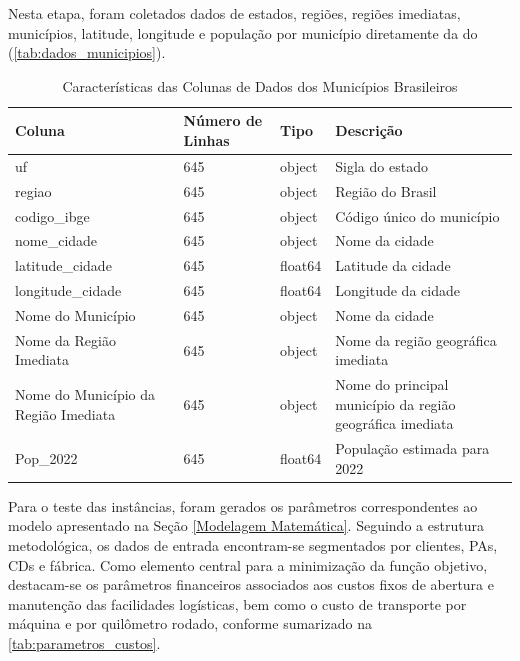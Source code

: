 Nesta etapa, foram coletados dados de estados, regiões, regiões imediatas, municípios, latitude, longitude e população por município diretamente da  do  \cite{ibge:2025:divisoesregionais} (\autoref{tab:dados_municipios}).

\begin{table}[h!]
\centering
\caption{Características das Colunas de Dados dos Municípios Brasileiros}
\label{tab:dados_municipios}
\begin{tabular}{|p{5cm}|p{2cm}|p{2cm}|p{5cm}|} %
\hline
\textbf{Coluna} & \textbf{Número de Linhas} & \textbf{Tipo} & \textbf{Descrição} \\
\hline
uf & 645 & object & Sigla do estado \\
\hline %
regiao & 645 & object & Região do Brasil \\
\hline %
codigo\_ibge & 645 & object & Código único do município \\
\hline %
nome\_cidade & 645 & object & Nome da cidade \\
\hline %
latitude\_cidade & 645 & float64 & Latitude da cidade \\
\hline %
longitude\_cidade & 645 & float64 & Longitude da cidade \\
\hline %
Nome do Município & 645 & object & Nome da cidade \\
\hline %
Nome da Região Imediata & 645 & object & Nome da região geográfica imediata \\
\hline %
Nome do Município da Região Imediata & 645 & object & Nome do principal município da região geográfica imediata \\
\hline %
Pop\_2022 & 645 & float64 & População estimada para 2022 \\
\hline
\end{tabular}
\end{table}


Para o teste das instâncias, foram gerados os parâmetros correspondentes ao modelo apresentado na Seção \ref{Modelagem Matemática}. Seguindo a estrutura metodológica, os dados de entrada encontram-se segmentados por clientes, PAs, CDs e fábrica. Como elemento central para a minimização da função objetivo, destacam-se os parâmetros financeiros associados aos custos fixos de abertura e manutenção das facilidades logísticas, bem como o custo de transporte por máquina e por quilômetro rodado, conforme sumarizado na \autoref{tab:parametros_custos}.

